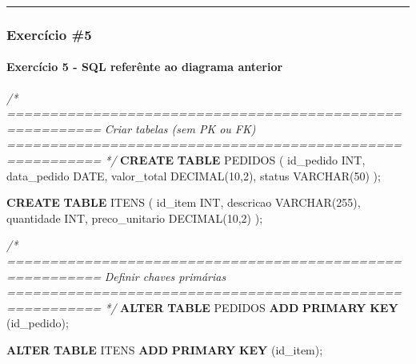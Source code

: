 \documentclass[
]{book}
\newenvironment{Shaded}{\begin{snugshade}}{\end{snugshade}}
\newcommand{\CommentTok}[1]{\textcolor[rgb]{0.56,0.35,0.01}{\textit{#1}}}
\newcommand{\DataTypeTok}[1]{\textcolor[rgb]{0.13,0.29,0.53}{#1}}
\newcommand{\DecValTok}[1]{\textcolor[rgb]{0.00,0.00,0.81}{#1}}
\newcommand{\KeywordTok}[1]{\textcolor[rgb]{0.13,0.29,0.53}{\textbf{#1}}}
\newcommand{\NormalTok}[1]{#1}
\begin{document}
\begin{center}\rule{0.5\linewidth}{0.5pt}\end{center}

\subsubsection{Exercício \#5}\label{exercuxedcio-5}



\paragraph{Exercício 5 - SQL referênte ao diagrama anterior}\label{exercuxedcio-5---sql-referuxeante-ao-diagrama-anterior}

\begin{Shaded}
\begin{Highlighting}[]
\CommentTok{/* =========================================================}
\CommentTok{   Criar tabelas (sem PK ou FK)}
\CommentTok{   ========================================================= */}
\KeywordTok{CREATE} \KeywordTok{TABLE}\NormalTok{ PEDIDOS }
\NormalTok{(}
\NormalTok{    id\_pedido }\DataTypeTok{INT}\NormalTok{,}
\NormalTok{    data\_pedido }\DataTypeTok{DATE}\NormalTok{,}
\NormalTok{    valor\_total }\DataTypeTok{DECIMAL}\NormalTok{(}\DecValTok{10}\NormalTok{,}\DecValTok{2}\NormalTok{),}
\NormalTok{    status }\DataTypeTok{VARCHAR}\NormalTok{(}\DecValTok{50}\NormalTok{)}
\NormalTok{);}

\KeywordTok{CREATE} \KeywordTok{TABLE}\NormalTok{ ITENS }
\NormalTok{(}
\NormalTok{    id\_item }\DataTypeTok{INT}\NormalTok{,}
\NormalTok{    descricao }\DataTypeTok{VARCHAR}\NormalTok{(}\DecValTok{255}\NormalTok{),}
\NormalTok{    quantidade }\DataTypeTok{INT}\NormalTok{,}
\NormalTok{    preco\_unitario }\DataTypeTok{DECIMAL}\NormalTok{(}\DecValTok{10}\NormalTok{,}\DecValTok{2}\NormalTok{)}
\NormalTok{);}

\CommentTok{/* =========================================================}
\CommentTok{   Definir chaves primárias}
\CommentTok{   ========================================================= */}
\KeywordTok{ALTER} \KeywordTok{TABLE}\NormalTok{ PEDIDOS }\KeywordTok{ADD} \KeywordTok{PRIMARY} \KeywordTok{KEY}\NormalTok{ (id\_pedido);}

\KeywordTok{ALTER} \KeywordTok{TABLE}\NormalTok{ ITENS }\KeywordTok{ADD} \KeywordTok{PRIMARY} \KeywordTok{KEY}\NormalTok{ (id\_item);}


\end{Highlighting}
\end{Shaded}
\end{document}
